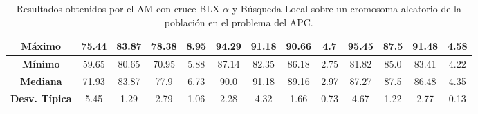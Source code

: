 \documentclass[11pt,a4paper]{article}
\begin{document}
\begin{table}[H]
{\begin{tabular}{c|c|c|c|c|c|c|c|c|c|c|c|c|}
\multicolumn{1}{|c|}{\textbf{Máximo}}       & 75.44             & 83.87                   & 78.38         & 8.95       & 94.29             & 91.18          & 90.66         & 4.7        & 95.45             & 87.5           & 91.48         & 4.58       \\ \hline
\multicolumn{1}{|c|}{\textbf{Mínimo}}       & 59.65             & 80.65                   & 70.95         & 5.88       & 87.14             & 82.35          & 86.18         & 2.75       & 81.82             & 85.0           & 83.41         & 4.22       \\ \hline
\multicolumn{1}{|c|}{\textbf{Mediana}}      & 71.93             & 83.87                   & 77.9          & 6.73       & 90.0              & 91.18          & 89.16         & 2.97       & 87.27             & 87.5           & 86.48         & 4.35       \\ \hline
\multicolumn{1}{|c|}{\textbf{Desv. Típica}} & 5.45              & 1.29                    & 2.79          & 1.06       & 2.28              & 4.32           & 1.66          & 0.73       & 4.67              & 1.22           & 2.77          & 0.13       \\ \hline
\end{tabular}
}%
\caption{Resultados obtenidos por el AM con cruce BLX-$\alpha$ y Búsqueda Local sobre un cromosoma aleatorio  de la población
en el problema del APC.}
\end{table}
\end{document}
